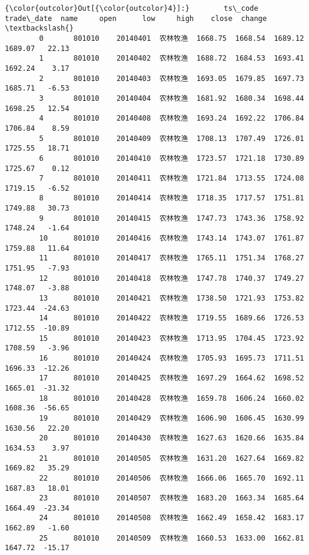 \documentclass[11pt]{article}
\begin{document}
\begin{Verbatim}[commandchars=\\\{\}]
{\color{outcolor}Out[{\color{outcolor}4}]:}        ts\_code  trade\_date  name     open      low     high    close  change  \textbackslash{}
        0       801010    20140401  农林牧渔  1668.75  1668.54  1689.12  1689.07   22.13   
        1       801010    20140402  农林牧渔  1688.72  1684.53  1693.41  1692.24    3.17   
        2       801010    20140403  农林牧渔  1693.05  1679.85  1697.73  1685.71   -6.53   
        3       801010    20140404  农林牧渔  1681.92  1680.34  1698.44  1698.25   12.54   
        4       801010    20140408  农林牧渔  1693.24  1692.22  1706.84  1706.84    8.59   
        5       801010    20140409  农林牧渔  1708.13  1707.49  1726.01  1725.55   18.71   
        6       801010    20140410  农林牧渔  1723.57  1721.18  1730.89  1725.67    0.12   
        7       801010    20140411  农林牧渔  1721.84  1713.55  1724.08  1719.15   -6.52   
        8       801010    20140414  农林牧渔  1718.35  1717.57  1751.81  1749.88   30.73   
        9       801010    20140415  农林牧渔  1747.73  1743.36  1758.92  1748.24   -1.64   
        10      801010    20140416  农林牧渔  1743.14  1743.07  1761.87  1759.88   11.64   
        11      801010    20140417  农林牧渔  1765.11  1751.34  1768.27  1751.95   -7.93   
        12      801010    20140418  农林牧渔  1747.78  1740.37  1749.27  1748.07   -3.88   
        13      801010    20140421  农林牧渔  1738.50  1721.93  1753.82  1723.44  -24.63   
        14      801010    20140422  农林牧渔  1719.55  1689.66  1726.53  1712.55  -10.89   
        15      801010    20140423  农林牧渔  1713.95  1704.45  1723.92  1708.59   -3.96   
        16      801010    20140424  农林牧渔  1705.93  1695.73  1711.51  1696.33  -12.26   
        17      801010    20140425  农林牧渔  1697.29  1664.62  1698.52  1665.01  -31.32   
        18      801010    20140428  农林牧渔  1659.78  1606.24  1660.02  1608.36  -56.65   
        19      801010    20140429  农林牧渔  1606.90  1606.45  1630.99  1630.56   22.20   
        20      801010    20140430  农林牧渔  1627.63  1620.66  1635.84  1634.53    3.97   
        21      801010    20140505  农林牧渔  1631.20  1627.64  1669.82  1669.82   35.29   
        22      801010    20140506  农林牧渔  1666.06  1665.70  1692.11  1687.83   18.01   
        23      801010    20140507  农林牧渔  1683.20  1663.34  1685.64  1664.49  -23.34   
        24      801010    20140508  农林牧渔  1662.49  1658.42  1683.17  1662.89   -1.60   
        25      801010    20140509  农林牧渔  1660.53  1633.00  1662.81  1647.72  -15.17   

\end{Verbatim}
\end{document}
